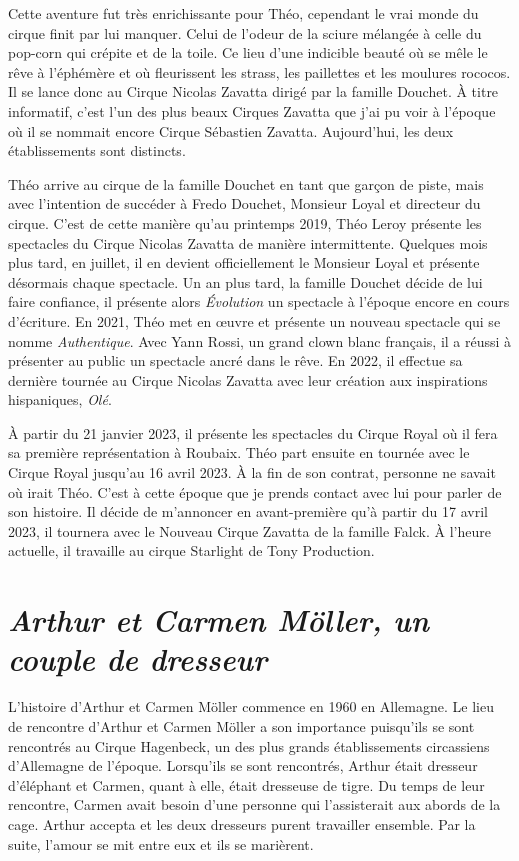 Cette aventure fut très enrichissante pour Théo, cependant le vrai monde du cirque finit par lui manquer. Celui de l'odeur de la sciure mélangée à celle du pop-corn qui crépite et de la toile. Ce lieu d'une indicible beauté où se mêle le rêve à l'éphémère et où fleurissent les strass, les paillettes et les moulures rococos. Il se lance donc au Cirque Nicolas Zavatta dirigé par la famille Douchet. À titre informatif, c'est l'un des plus beaux Cirques Zavatta que j'ai pu voir à l’époque où il se nommait encore Cirque Sébastien Zavatta. Aujourd'hui, les deux établissements sont distincts.

Théo arrive au cirque de la famille Douchet en tant que garçon de piste, mais avec l'intention de succéder à Fredo Douchet, Monsieur Loyal et directeur du cirque. C'est de cette manière qu'au printemps 2019, Théo Leroy présente les spectacles du Cirque Nicolas Zavatta de manière intermittente. Quelques mois plus tard, en juillet, il en devient officiellement le Monsieur Loyal et présente désormais chaque spectacle. Un an plus tard, la famille Douchet décide de lui faire confiance, il présente alors \textit{Évolution} un spectacle à l'époque encore en cours d'écriture. En 2021, Théo met en œuvre et présente un nouveau spectacle qui se nomme \textit{Authentique}. Avec Yann Rossi, un grand clown blanc français, il a réussi à présenter au public un spectacle ancré dans le rêve. En 2022, il effectue sa dernière tournée au Cirque Nicolas Zavatta avec leur création aux inspirations hispaniques, \textit{Olé}.

À partir du 21 janvier 2023, il présente les spectacles du Cirque Royal où il fera sa première représentation à Roubaix. Théo part ensuite en tournée avec le Cirque Royal jusqu'au 16 avril 2023. À la fin de son contrat, personne ne savait où irait Théo. C'est à cette époque que je prends contact avec lui pour parler de son histoire. Il décide de m'annoncer en avant-première qu'à partir du 17 avril 2023, il tournera avec le Nouveau Cirque Zavatta de la famille Falck. À l’heure actuelle, il travaille au cirque Starlight de Tony Production.

\section*{\textit{Arthur et Carmen Möller, un couple de dresseur  }}
{}

L’histoire d’Arthur et Carmen Möller commence en 1960 en Allemagne. Le lieu de rencontre d’Arthur et Carmen Möller a son importance puisqu’ils se sont rencontrés au Cirque Hagenbeck, un des plus grands établissements circassiens d’Allemagne de l’époque. Lorsqu’ils se sont rencontrés, Arthur était dresseur d’éléphant et Carmen, quant à elle, était dresseuse de tigre. Du temps de leur rencontre, Carmen avait besoin d’une personne qui l’assisterait aux abords de la cage. Arthur accepta et les deux dresseurs purent travailler ensemble. Par la suite, l’amour se mit entre eux et ils se marièrent.

